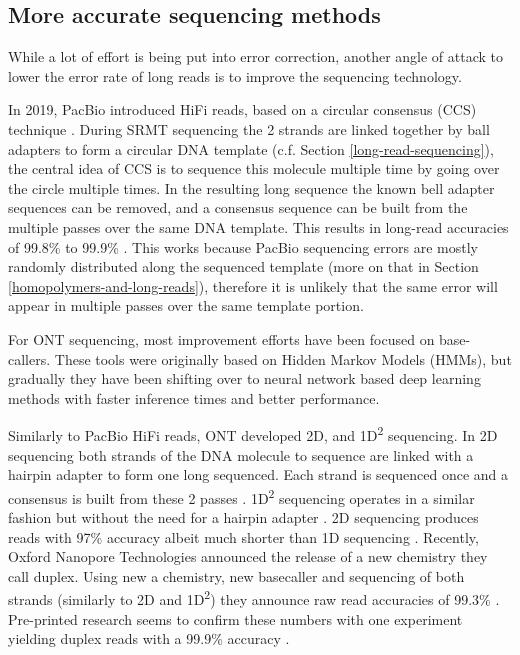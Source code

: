 \documentclass[
  11pt,
  twoside,
  BCOR=10mm,
  listof=totoc]{scrbook}
\begin{document}
\hypertarget{more-accurate-sequencing-methods}{%
\subsection{More accurate sequencing methods}\label{more-accurate-sequencing-methods}}

While a lot of effort is being put into error correction, another angle of attack to lower the error rate of long reads is to improve the sequencing technology.

In 2019, PacBio introduced HiFi reads, based on a circular consensus (CCS) technique \autocite{wenger2019}. During SRMT sequencing the 2 strands are linked together by ball adapters to form a circular DNA template (c.f. Section \ref{long-read-sequencing}), the central idea of CCS is to sequence this molecule multiple time by going over the circle multiple times. In the resulting long sequence the known bell adapter sequences can be removed, and a consensus sequence can be built from the multiple passes over the same DNA template. This results in long-read accuracies of 99.8\% to 99.9\% \autocite{wenger2019,logsdonLongreadHumanGenome2020}. This works because PacBio sequencing errors are mostly randomly distributed along the sequenced template (more on that in Section \ref{homopolymers-and-long-reads}), therefore it is unlikely that the same error will appear in multiple passes over the same template portion.

For ONT sequencing, most improvement efforts have been focused on base-callers. These tools were originally based on Hidden Markov Models \autocite{timpDNABaseCallingNanopore2012} (HMMs), but gradually they have been shifting over to neural network based deep learning methods \autocite{peresiniNanoporeBaseCalling2021,bozaDeepNanoDeepRecurrent2017,wickPerformanceNeuralNetwork2019,amarasingheOpportunitiesChallengesLongread2020} with faster inference times and better performance.

Similarly to PacBio HiFi reads, ONT developed 2D, and 1D\textsuperscript{2} sequencing. In 2D sequencing both strands of the DNA molecule to sequence are linked with a hairpin adapter to form one long sequenced. Each strand is sequenced once and a consensus is built from these 2 passes \autocite{tylerEvaluationOxfordNanopore2018}. 1D\textsuperscript{2} sequencing operates in a similar fashion but without the need for a hairpin adapter \autocite{linNanoporeTechnologyIts2021}. 2D sequencing produces reads with 97\% accuracy albeit much shorter than 1D sequencing \autocite{tylerEvaluationOxfordNanopore2018}. Recently, Oxford Nanopore Technologies announced the release of a new chemistry they call duplex. Using new a chemistry, new basecaller and sequencing of both strands (similarly to 2D and 1D\textsuperscript{2}) they announce raw read accuracies of 99.3\% \autocite{OxfordNanoporeTech}. Pre-printed research seems to confirm these numbers with one experiment yielding duplex reads with a 99.9\% accuracy \autocite{sandersonComparisonR9Kit102022}.
\end{document}

